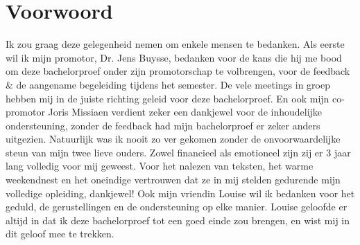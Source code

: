 
\chapter*{Voorwoord}
\label{ch:voorwoord}


Ik zou graag deze gelegenheid nemen om enkele mensen te bedanken. 
Als eerste wil ik mijn promotor, Dr. Jens Buysse, bedanken voor de
kans die hij me bood om deze bachelorproef onder zijn promotorschap te volbrengen, voor
de feedback \& de aangename begeleiding tijdens het semester. De vele meetings in groep hebben mij in de juiste richting geleid voor deze bachelorproef. En ook mijn co-promotor Joris Missiaen verdient zeker een dankjewel voor de inhoudelijke ondersteuning, zonder de feedback had mijn bachelorproef er zeker anders uitgezien.
Natuurlijk was ik nooit zo ver gekomen zonder de onvoorwaardelijke steun van
mijn twee lieve ouders. Zowel financieel als emotioneel zijn zij er 3 jaar lang volledig
voor mij geweest. Voor het nalezen van teksten, het warme weekendnest en het oneindige vertrouwen dat ze in mij stelden
gedurende mijn volledige opleiding, dankjewel! Ook mijn vriendin Louise wil ik bedanken voor het geduld, de gerustellingen en de ondersteuning op elke manier. Louise geloofde er altijd in dat ik deze bachelorproef tot een goed einde zou brengen, en wist mij in dit geloof mee te trekken. 
